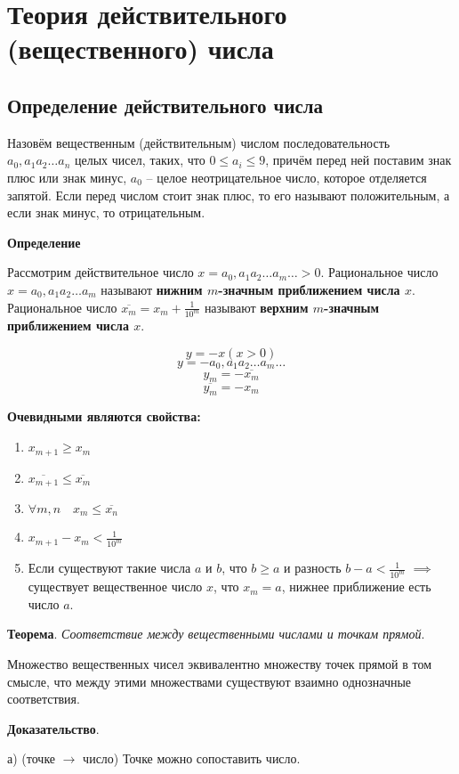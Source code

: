 \documentclass{article}
\begin{document}
\section{Теория действительного (вещественного) числа}
\subsection{Определение действительного числа}
Назовём вещественным (действительным) числом последовательность
$a_0,a_1 a_2 \dots a_n$ целых чисел, таких, что $0 \le a_i \le 9$,
причём перед ней поставим знак плюс или знак минус,
$a_0$ -- целое неотрицательное число, которое отделяется запятой.
Если перед числом стоит знак плюс, то его называют положительным,
а если знак минус, то отрицательным.

\textbf{Определение}

Рассмотрим действительное число $x = a_0,a_1 a_2 \dots a_m \dots > 0$.
Рациональное число $x = a_0,a_1 a_2 \dots a_m$ называют
\textbf{нижним $m$-значным приближением числа $x$}.
Рациональное число $\overline{x_m} = x_m + \frac{1}{10^m}$ называют
\textbf{верхним $m$-значным приближением числа $x$}.

\[y = -x (x > 0)\]
\[y = -a_0,a_1 a_2 \dots a_m \dots\]
\[y_m = -\overline{x_m}\]
\[\overline{y_m} = -x_m\]

\textbf{Очевидными являются свойства:}
\begin{enumerate}
    \item $x_{m+1} \ge x_m$
    \item $\overline{x_{m+1}} \le \overline{x_m}$
    \item $\forall m,n \quad x_m \le \overline{x_n}$
    \item $x_{m+1} - x_m < \frac{1}{10^m}$
    \item Если существуют такие числа $a$ и $b$, что $b \ge a$
    и разность $b - a < \frac{1}{10^m}$ $\implies$ существует
    вещественное число $x$, что $x_m = a$, нижнее приближение есть число $a$.
\end{enumerate}

\textbf{Теорема}. \textit{Соответствие между вещественными числами и точкам прямой}.

Множество вещественных чисел эквивалентно множеству точек прямой в том смысле, что
между этими множествами существуют взаимно однозначные соответствия.

\textbf{Доказательство}.

а) (точке $\rightarrow$ число) Точке можно сопоставить число.
\end{document}
